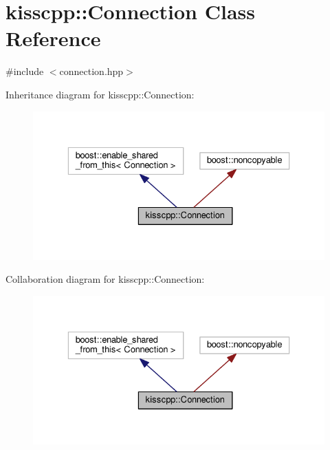 \hypertarget{classkisscpp_1_1_connection}{\section{kisscpp\-:\-:Connection Class Reference}
\label{classkisscpp_1_1_connection}
}


{\ttfamily \#include $<$connection.\-hpp$>$}



Inheritance diagram for kisscpp\-:\-:Connection\-:
\nopagebreak
\begin{figure}[H]
\begin{center}
\leavevmode
\includegraphics[width=329pt]{classkisscpp_1_1_connection__inherit__graph}
\end{center}
\end{figure}


Collaboration diagram for kisscpp\-:\-:Connection\-:
\nopagebreak
\begin{figure}[H]
\begin{center}
\leavevmode
\includegraphics[width=329pt]{classkisscpp_1_1_connection__coll__graph}
\end{center}
\end{figure}

